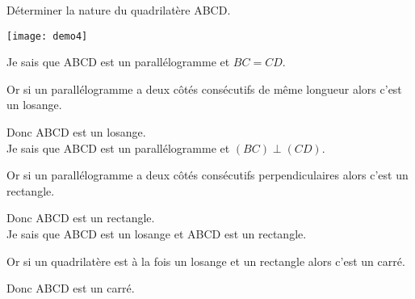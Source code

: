 	\begin{myex}
		Déterminer la nature du quadrilatère ABCD.
		
		\begin{center}
			\texttt{[image: demo4]}
		\end{center}
		
		Je sais que ABCD est un parallélogramme et $BC=CD$.
		
		Or si un parallélogramme a deux côtés consécutifs de même longueur alors c'est un losange.
		
		Donc ABCD est un losange.\\
		
		Je sais que ABCD est un parallélogramme et $(BC) \perp (CD)$.
		
		Or si un parallélogramme a deux côtés consécutifs perpendiculaires alors c'est un rectangle.
		
		Donc ABCD est un rectangle.\\
		
		Je sais que ABCD est un losange et ABCD est un rectangle.
		
		Or si un quadrilatère est à la fois un losange et un rectangle alors c'est un carré.
		
		Donc ABCD est un carré.
	\end{myex}